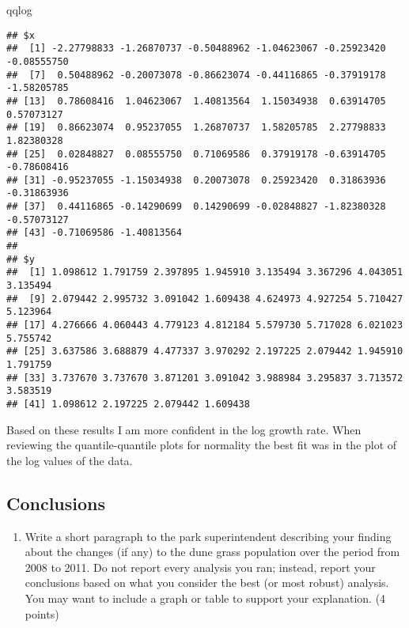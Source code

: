 \documentclass[
]{article}
\newenvironment{Shaded}{\begin{snugshade}}{\end{snugshade}}
\newcommand{\NormalTok}[1]{#1}
\providecommand{\tightlist}{%
  \setlength{\itemsep}{0pt}\setlength{\parskip}{0pt}}
\begin{document}
\begin{Shaded}
\begin{Highlighting}[]
\NormalTok{qqlog}
\end{Highlighting}
\end{Shaded}

\begin{verbatim}
## $x
##  [1] -2.27798833 -1.26870737 -0.50488962 -1.04623067 -0.25923420 -0.08555750
##  [7]  0.50488962 -0.20073078 -0.86623074 -0.44116865 -0.37919178 -1.58205785
## [13]  0.78608416  1.04623067  1.40813564  1.15034938  0.63914705  0.57073127
## [19]  0.86623074  0.95237055  1.26870737  1.58205785  2.27798833  1.82380328
## [25]  0.02848827  0.08555750  0.71069586  0.37919178 -0.63914705 -0.78608416
## [31] -0.95237055 -1.15034938  0.20073078  0.25923420  0.31863936 -0.31863936
## [37]  0.44116865 -0.14290699  0.14290699 -0.02848827 -1.82380328 -0.57073127
## [43] -0.71069586 -1.40813564
## 
## $y
##  [1] 1.098612 1.791759 2.397895 1.945910 3.135494 3.367296 4.043051 3.135494
##  [9] 2.079442 2.995732 3.091042 1.609438 4.624973 4.927254 5.710427 5.123964
## [17] 4.276666 4.060443 4.779123 4.812184 5.579730 5.717028 6.021023 5.755742
## [25] 3.637586 3.688879 4.477337 3.970292 2.197225 2.079442 1.945910 1.791759
## [33] 3.737670 3.737670 3.871201 3.091042 3.988984 3.295837 3.713572 3.583519
## [41] 1.098612 2.197225 2.079442 1.609438
\end{verbatim}

Based on these results I am more confident in the log growth rate. When
reviewing the quantile-quantile plots for normality the best fit was in
the plot of the log values of the data.

\hypertarget{conclusions}{%
\subsection{Conclusions}\label{conclusions}}

\begin{enumerate}
\def\labelenumi{\arabic{enumi}.}
\setcounter{enumi}{8}
\tightlist
\item
  Write a short paragraph to the park superintendent describing your
  finding about the changes (if any) to the dune grass population over
  the period from 2008 to 2011. Do not report every analysis you ran;
  instead, report your conclusions based on what you consider the best
  (or most robust) analysis. You may want to include a graph or table to
  support your explanation. (4 points)
\end{enumerate}
\end{document}
